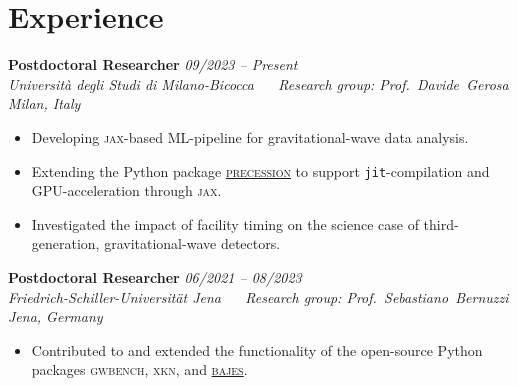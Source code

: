 \documentclass[10pt, a4paper]{article}
\makeatletter
\newcommand{\cventry}[4]{%
  \textbf{#1}                      \hfill {\color{muted}\small\textit{#4}} \\[2pt]
  {\color{muted}\small\textit{#2}} \hfill {\color{muted}\small\textit{#3}}
}
\newcommand{\tpc}{\textperiodcentered}
\makeatother
\begin{document}
\section{Experience}

\cventry%
  {Postdoctoral Researcher}%
  {Universit\`a degli Studi di Milano-Bicocca
  ~\tpc~ Research group: Prof.\ Davide\ Gerosa}%
  {Milan, Italy}%
  {09/2023 -- Present}
\begin{itemize}
  \item Developing \textsc{jax}-based ML-pipeline for gravitational-wave data analysis.
  \item Extending the Python package \href{https://github.com/dgerosa/precession}{\textsc{precession}} to support \texttt{jit}-compilation and GPU-acceleration through \textsc{jax}.
  \item Investigated the impact of facility timing on the science case of third-generation, gravitational-wave detectors.
\end{itemize}

\vspace{6pt}
\cventry%
  {Postdoctoral Researcher}%
  {Friedrich-Schiller-Universit\"at Jena ~\tpc~ Research group: Prof.\ Sebastiano\ Bernuzzi}%
  {Jena, Germany}%
  {06/2021 -- 08/2023}
\begin{itemize}
  \item Contributed to and extended the functionality of the open-source Python packages \textsc{gwbench}, \textsc{xkn}, and \href{https://github.com/matteobreschi/bajes}{\textsc{bajes}}.
\end{itemize}
\end{document}
